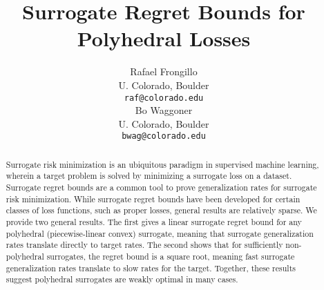 \documentclass{article}
\title{Surrogate Regret Bounds for Polyhedral Losses}
\author{%
  Rafael Frongillo \\
  U. Colorado, Boulder \\
  \texttt{raf@colorado.edu} \\
  \And
  Bo Waggoner \\
  U. Colorado, Boulder \\
  \texttt{bwag@colorado.edu}
}
\theoremstyle{definition}\newtheorem{definition}{Definition}
\theoremstyle{definition}\newtheorem{assumption}{Assumption}
\begin{document}
\maketitle

\begin{abstract}
  Surrogate risk minimization is an ubiquitous paradigm in supervised machine learning, wherein a target problem is solved by minimizing a surrogate loss on a dataset.
  Surrogate regret bounds are a common tool to prove generalization rates for surrogate risk minimization.
  While surrogate regret bounds have been developed for certain classes of loss functions, such as proper losses, general results are relatively sparse.
  We provide two general results.
  The first gives a linear surrogate regret bound for any polyhedral (piecewise-linear convex) surrogate, meaning that surrogate generalization rates translate directly to target rates.
  The second shows that for sufficiently non-polyhedral surrogates, the regret bound is a square root, meaning fast surrogate generalization rates translate to slow rates for the target.
  Together, these results suggest polyhedral surrogates are weakly optimal in many cases.
\end{abstract}
\end{document}
